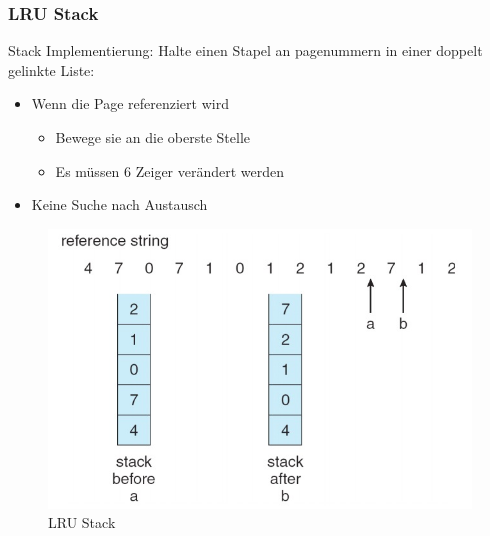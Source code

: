 \documentclass[a4paper]{scrreprt}
\begin{document}
\subsubsection{LRU Stack}
Stack Implementierung: Halte einen Stapel an pagenummern in einer doppelt gelinkte Liste: \ \\
\begin{itemize}

\item Wenn die Page referenziert wird
\begin{itemize}
\item Bewege sie an die oberste Stelle
\item Es müssen 6 Zeiger verändert werden
\end{itemize}
\item Keine Suche nach Austausch
\end{itemize}
\begin{figure}[ht]
\centering
\includegraphics[scale=0.5]{graphics/LRUstack.png}
\caption{LRU Stack}
\end{figure}
\end{document}
